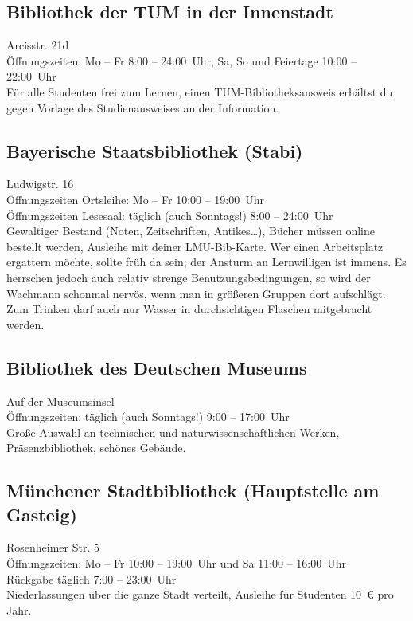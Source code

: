 \subsection*{Bibliothek der TUM in der Innenstadt}
Arcisstr. 21d\\
Öffnungszeiten: Mo -- Fr 8:00 -- 24:00~Uhr, Sa, So und Feiertage 10:00 -- 22:00~Uhr\\
Für alle Studenten frei zum Lernen, einen TUM-Bibliotheksausweis erhältst du gegen Vorlage des Studienausweises an der Information.

\begin{urlList}
\end{urlList}

\subsection*{Bayerische Staatsbibliothek (Stabi)}
Ludwigstr. 16\\
Öffnungszeiten Ortsleihe: Mo -- Fr 10:00 -- 19:00~Uhr\\
Öffnungszeiten Lesesaal: täglich (auch Sonntags!) 8:00 -- 24:00~Uhr\\
Gewaltiger Bestand (Noten, Zeitschriften, Antikes\ldots), Bücher
müssen online bestellt werden, Ausleihe mit deiner LMU-Bib-Karte. Wer
einen Arbeitsplatz ergattern möchte, sollte früh da sein; der
Ansturm an Lernwilligen ist immens.
Es herrschen jedoch auch relativ strenge Benutzungsbedingungen, so wird der Wachmann schonmal nervös, wenn man in größeren Gruppen dort aufschlägt.
Zum Trinken darf auch nur Wasser in durchsichtigen Flaschen mitgebracht werden.

\begin{urlList}
\end{urlList}

\subsection*{Bibliothek des Deutschen Museums}
Auf der Museumsinsel\\
Öffnungszeiten: täglich (auch Sonntags!) 9:00 -- 17:00~Uhr\\
Große Auswahl an technischen und naturwissenschaftlichen Werken, Präsenzbibliothek, schönes Gebäude.

\begin{urlList}
\end{urlList}

\subsection*{Münchener Stadtbibliothek (Hauptstelle am Gasteig)}
Rosenheimer Str. 5\\
Öffnungszeiten: Mo -- Fr 10:00 -- 19:00~Uhr und Sa 11:00 -- 16:00~Uhr\\
Rückgabe täglich 7:00 -- 23:00~Uhr\\
Niederlassungen über die ganze Stadt verteilt, Ausleihe für Studenten 10~€ pro Jahr.

\begin{urlList}
\end{urlList}

